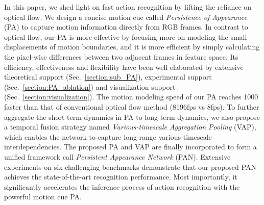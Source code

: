 \documentclass[journal]{IEEEtran}
\begin{document}
In this paper, we shed light on fast action recognition by lifting the reliance on optical flow. We design a concise motion cue called \emph{Persistence of Appearance} (PA) to capture motion information directly from RGB frames. In contrast to optical flow, our PA is more effective by focusing more on modeling the small displacements of motion boundaries, and it is more efficient by simply calculating the pixel-wise differences between two adjacent frames in feature space. Its efficiency, effectiveness and flexibility have been well elaborated by extensive theoretical support (Sec.~\ref{section:sub_PA}), experimental support (Sec.~\ref{section:PA_ablation}) and visualization support (Sec.~\ref{section:visualization}). The motion modeling speed of our PA reaches 1000 faster than that of conventional optical flow method (8196fps vs 8fps). To further aggregate the short-term dynamics in PA to long-term dynamics, we also propose a temporal fusion strategy named \emph{Various-timescale Aggregation Pooling} (VAP), which enables the network to capture long-range various-timescale interdependencies. The proposed PA and VAP are finally incorporated to form a unified framework call \emph{Persistent Appearance Network} (PAN). Extensive experiments on six challenging benchmarks demonstrate that our proposed PAN achieves the state-of-the-art recognition performance. Most importantly, it significantly accelerates the inference process of action recognition with the powerful motion cue PA.
\end{document}
